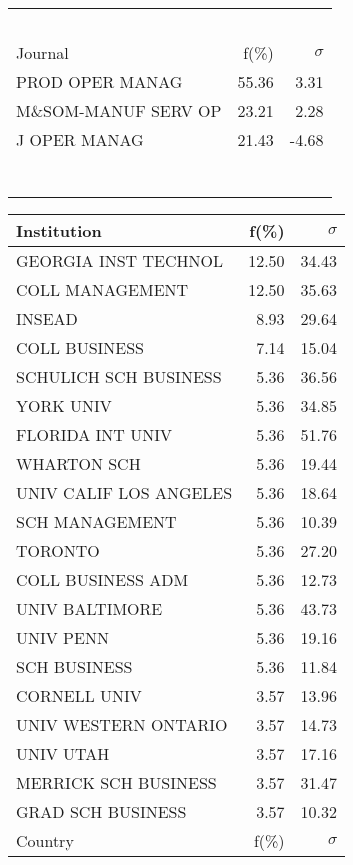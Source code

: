 \documentclass[a4paper,11pt]{report}
\begin{document}
\begin{landscape}
\begin{table}[!ht]
{\begin{tabular}{|l r  r|}
 &  & \\
 &  & \\
 &  & \\
 &  & \\
 &  & \\
\hline
\hline
Journal & f(\%) & $\sigma$\\
\hline
PROD OPER MANAG & 55.36 & 3.31\\
M\&SOM-MANUF SERV OP & 23.21 & 2.28\\
J OPER MANAG & 21.43 & -4.68\\
 &  & \\
 &  & \\
 &  & \\
 &  & \\
 &  & \\
 &  & \\
 &  & \\
\hline
\end{tabular}
}
{\scriptsize\begin{tabular}{|l r r|}
\hline
Institution & f(\%) & $\sigma$\\
\hline
GEORGIA INST TECHNOL & 12.50 & 34.43\\
COLL MANAGEMENT & 12.50 & 35.63\\
INSEAD & 8.93 & 29.64\\
COLL BUSINESS & 7.14 & 15.04\\
SCHULICH SCH BUSINESS & 5.36 & 36.56\\
YORK UNIV & 5.36 & 34.85\\
FLORIDA INT UNIV & 5.36 & 51.76\\
WHARTON SCH & 5.36 & 19.44\\
UNIV CALIF LOS ANGELES & 5.36 & 18.64\\
SCH MANAGEMENT & 5.36 & 10.39\\
TORONTO & 5.36 & 27.20\\
COLL BUSINESS ADM & 5.36 & 12.73\\
UNIV BALTIMORE & 5.36 & 43.73\\
UNIV PENN & 5.36 & 19.16\\
SCH BUSINESS & 5.36 & 11.84\\
CORNELL UNIV & 3.57 & 13.96\\
UNIV WESTERN ONTARIO & 3.57 & 14.73\\
UNIV UTAH & 3.57 & 17.16\\
MERRICK SCH BUSINESS & 3.57 & 31.47\\
GRAD SCH BUSINESS & 3.57 & 10.32\\
\hline
\hline
Country & f(\%) & $\sigma$\\

\end{tabular}}
\end{table}
\end{landscape}
\end{document}
